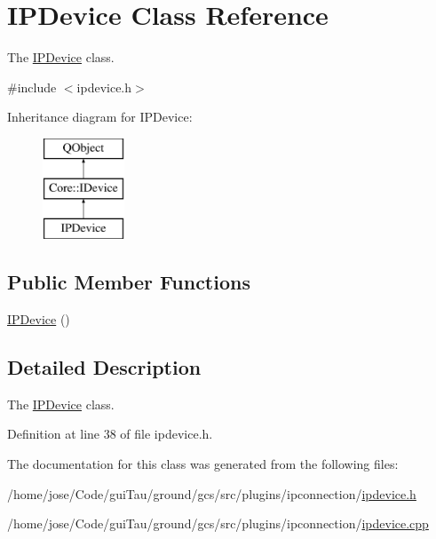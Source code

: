 \hypertarget{class_i_p_device}{\section{I\-P\-Device Class Reference}
\label{class_i_p_device}
}


The \hyperlink{class_i_p_device}{I\-P\-Device} class.  




{\ttfamily \#include $<$ipdevice.\-h$>$}

Inheritance diagram for I\-P\-Device\-:\begin{figure}[H]
\begin{center}
\leavevmode
\includegraphics[height=3.000000cm]{class_i_p_device}
\end{center}
\end{figure}
\subsection*{Public Member Functions}
\begin{DoxyCompactItemize}
\item 
\hyperlink{group___core_plugin_ga010455234abea0dd5af6ce5f06632331}{I\-P\-Device} ()
\end{DoxyCompactItemize}


\subsection{Detailed Description}
The \hyperlink{class_i_p_device}{I\-P\-Device} class. 

Definition at line 38 of file ipdevice.\-h.



The documentation for this class was generated from the following files\-:\begin{DoxyCompactItemize}
\item 
/home/jose/\-Code/gui\-Tau/ground/gcs/src/plugins/ipconnection/\hyperlink{ipdevice_8h}{ipdevice.\-h}\item 
/home/jose/\-Code/gui\-Tau/ground/gcs/src/plugins/ipconnection/\hyperlink{ipdevice_8cpp}{ipdevice.\-cpp}\end{DoxyCompactItemize}
